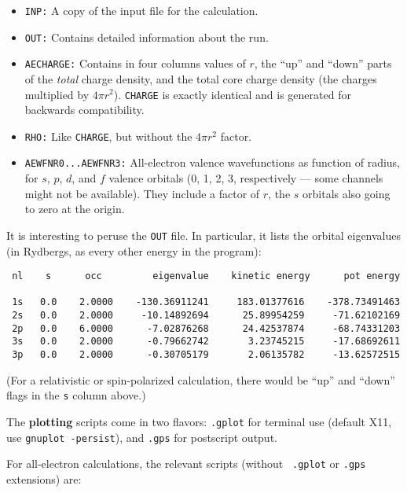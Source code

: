 \documentclass[11pt]{article}
\begin{document}
\begin{itemize}
\item {\tt INP:} A copy of the input file for the calculation.
\item {\tt OUT:} Contains detailed information about the run. 



\item  {\tt AECHARGE:} Contains in four
columns values of $r$, the ``up'' and ``down'' parts of the {\sl
total} charge density, and the total core charge density (the charges
multiplied by $4\pi r^2$). {\tt CHARGE} is exactly identical and is
generated for backwards compatibility.

\item {\tt RHO:} Like {\tt CHARGE}, but without the $4\pi r^2$ factor.
\item {\tt AEWFNR0...AEWFNR3:} All-electron valence wavefunctions as function
of radius, for $s$, $p$, $d$, and $f$ valence orbitals (0, 1, 2, 3,
respectively --- some channels might not be available). They include 
a factor of $r$, the $s$ orbitals also going to zero at the origin.

\end{itemize}

It is interesting to peruse the {\tt OUT} file.
In particular, it lists the orbital eigenvalues (in Rydbergs, as
every other energy in the program):

\begin{verbatim}
 nl    s      occ         eigenvalue    kinetic energy      pot energy

 1s   0.0    2.0000    -130.36911241     183.01377616    -378.73491463
 2s   0.0    2.0000     -10.14892694      25.89954259     -71.62102169
 2p   0.0    6.0000      -7.02876268      24.42537874     -68.74331203
 3s   0.0    2.0000      -0.79662742       3.23745215     -17.68692611
 3p   0.0    2.0000      -0.30705179       2.06135782     -13.62572515
\end{verbatim}

(For a relativistic or spin-polarized calculation, there would be
``up'' and ``down'' flags in the {\tt s} column above.)


The {\bf plotting} scripts come in two flavors: {\tt .gplot} for
terminal use (default X11, use {\tt gnuplot -persist}), and {\tt .gps}
for postscript output.  

For all-electron calculations, the relevant scripts (without {\tt
.gplot} or {\tt .gps} extensions) are:
\end{document}
